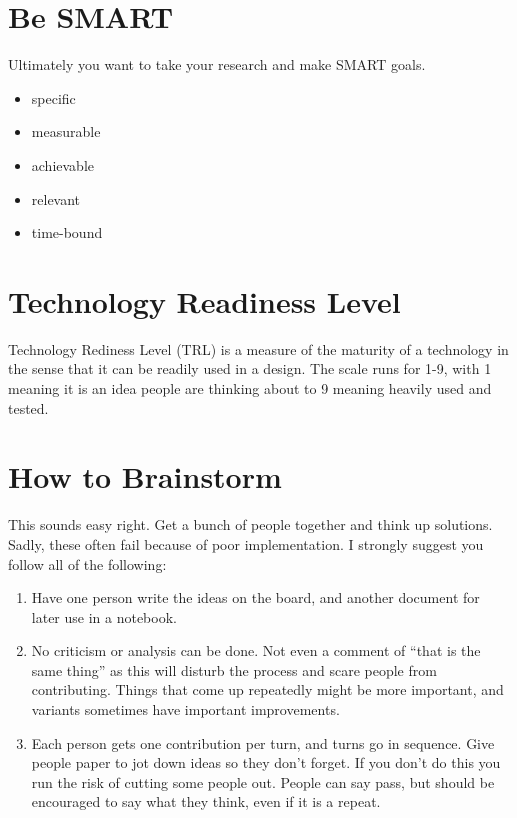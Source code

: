 \section{Be SMART}

Ultimately you want to take your research and make SMART goals.

\begin{itemize}
\item specific
\item measurable
\item achievable
\item relevant
\item time-bound
\end{itemize}

\section{Technology Readiness Level}

Technology Rediness Level (TRL) is a measure of the maturity of a technology in the sense that it can be readily used in a design.  The scale runs for 1-9, with 1 meaning it is an idea people are thinking about to 9 meaning heavily used and tested.


\section{How to Brainstorm}
This sounds easy right.  Get a bunch of people together and think up solutions.  Sadly, these often fail because of poor implementation.  I strongly suggest you follow all of the following:
\begin{enumerate}
\item Have one person write the ideas on the board, and another document for later use in a notebook.
\item No criticism or analysis can be done.  Not even a comment of ``that is the same thing'' as this will disturb the process and scare people from contributing.  Things that come up repeatedly might be more important, and variants sometimes have important improvements.
\item Each person gets one contribution per turn, and turns go in sequence.  Give people paper to jot down ideas so they don't forget.  If you don't do this you run the risk of cutting some people out.  People can say pass, but should be encouraged to say what they think, even if it is a repeat.
\end{enumerate}

